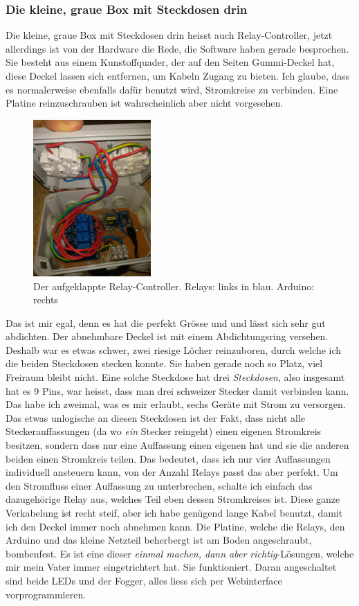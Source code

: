 \documentclass[12pt,titlepage,a4paper]{article}
\begin{document}
\subsubsection{Die kleine, graue Box mit Steckdosen drin}
Die kleine, graue Box mit Steckdosen drin heisst auch Relay-Controller, jetzt allerdings ist von der Hardware die Rede, die Software haben gerade besprochen. Sie besteht aus einem Kunstoffquader, der auf den Seiten Gummi-Deckel hat, diese Deckel lassen sich entfernen, um Kabeln  Zugang zu bieten. Ich glaube, dass es normalerweise ebenfalls dafür benutzt wird, Stromkreise zu verbinden. Eine Platine reinzuschrauben ist wahrscheinlich aber nicht vorgesehen. 
\begin{figure}
\centering
\includegraphics[width=0.4\textwidth, angle=-90]{relay}
\caption{\label{fig:relay}Der aufgeklappte Relay-Controller. Relays: links in blau. Arduino: rechts}
\end{figure}

Das ist mir egal, denn es hat die perfekt Grösse und und lässt sich sehr gut abdichten. Der abnehmbare Deckel ist mit einem Abdichtungsring versehen. Deshalb war es etwas schwer, zwei riesige Löcher reinzuboren, durch welche ich die beiden Steckdosen stecken konnte. Sie haben gerade noch so Platz, viel Freiraum bleibt nicht. Eine solche Steckdose hat drei \textit{Steckdosen}, also insgesamt hat es 9 Pins, war heisst, dass man drei schweizer Stecker damit verbinden kann. Das habe ich zweimal, was es mir erlaubt, sechs Geräte mit Strom zu versorgen. Das etwas unlogische an diesen Steckdosen ist der Fakt, dass nicht alle Steckerauffassungen (da wo \textit{ein} Stecker reingeht) einen eigenen Stromkreis besitzen, sondern dass nur eine Auffassung einen eigenen hat und sie die anderen beiden einen Stromkreis teilen. Das bedeutet, dass ich nur vier Auffassungen individuell ansteuern kann, von der Anzahl Relays passt das aber perfekt. Um den Stromfluss einer Auffassung zu unterbrechen, schalte ich einfach das dazugehörige Relay aus, welches Teil eben dessen Stromkreises ist. Diese ganze Verkabelung ist recht steif, aber ich habe genügend lange Kabel benutzt, damit ich den Deckel immer noch abnehmen kann. Die Platine, welche die Relays, den Arduino und das kleine Netzteil beherbergt ist am Boden angeschraubt, bombenfest. Es ist eine dieser \textit {einmal machen, dann aber richtig}-Lösungen, welche mir mein Vater immer eingetrichtert hat. Sie funktioniert. Daran angeschaltet sind beide LEDs und der Fogger, alles liess sich per Webinterface vorprogrammieren.
\end{document}

